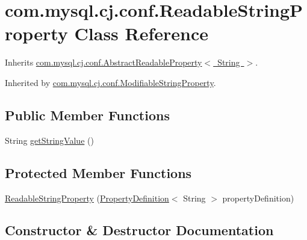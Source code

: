 \hypertarget{classcom_1_1mysql_1_1cj_1_1conf_1_1_readable_string_property}{}\section{com.\+mysql.\+cj.\+conf.\+Readable\+String\+Property Class Reference}
\label{classcom_1_1mysql_1_1cj_1_1conf_1_1_readable_string_property}


Inherits \mbox{\hyperlink{classcom_1_1mysql_1_1cj_1_1conf_1_1_abstract_readable_property}{com.\+mysql.\+cj.\+conf.\+Abstract\+Readable\+Property$<$ String $>$}}.



Inherited by \mbox{\hyperlink{classcom_1_1mysql_1_1cj_1_1conf_1_1_modifiable_string_property}{com.\+mysql.\+cj.\+conf.\+Modifiable\+String\+Property}}.

\subsection*{Public Member Functions}
\begin{DoxyCompactItemize}
\item 
String \mbox{\hyperlink{classcom_1_1mysql_1_1cj_1_1conf_1_1_readable_string_property_a80f31bf0ff94266fcec3d38571797c65}{get\+String\+Value}} ()
\end{DoxyCompactItemize}
\subsection*{Protected Member Functions}
\begin{DoxyCompactItemize}
\item 
\mbox{\hyperlink{classcom_1_1mysql_1_1cj_1_1conf_1_1_readable_string_property_a69329b92e69ca795dd06ae687d7dff99}{Readable\+String\+Property}} (\mbox{\hyperlink{interfacecom_1_1mysql_1_1cj_1_1conf_1_1_property_definition}{Property\+Definition}}$<$ String $>$ property\+Definition)
\end{DoxyCompactItemize}


\subsection{Constructor \& Destructor Documentation}
\mbox{\label{classcom_1_1mysql_1_1cj_1_1conf_1_1_readable_string_property_a69329b92e69ca795dd06ae687d7dff99}} 
